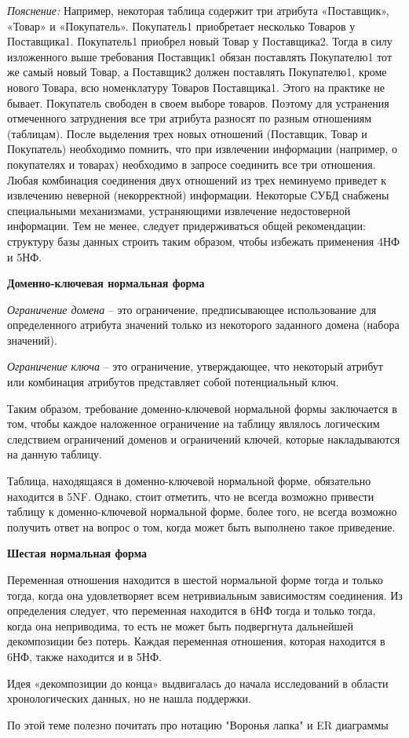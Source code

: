 \textit{Пояснение:} Например, некоторая таблица содержит три атрибута «Поставщик», «Товар» и «Покупатель». Покупатель1 приобретает несколько Товаров у Поставщика1. Покупатель1 приобрел новый Товар у Поставщика2. Тогда в силу изложенного выше требования Поставщик1 обязан поставлять Покупателю1 тот же самый новый Товар, а Поставщик2 должен поставлять Покупателю1, кроме нового Товара, всю номенклатуру Товаров Поставщика1. Этого на практике не бывает. Покупатель свободен в своем выборе товаров. Поэтому для устранения отмеченного затруднения все три атрибута разносят по разным отношениям (таблицам). После выделения трех новых отношений (Поставщик, Товар и Покупатель) необходимо помнить, что при извлечении информации (например, о покупателях и товарах) необходимо в запросе соединить все три отношения. Любая комбинация соединения двух отношений из трех неминуемо приведет к извлечению неверной (некорректной) информации. Некоторые СУБД снабжены специальными механизмами, устраняющими извлечение недостоверной информации. Тем не менее, следует придерживаться общей рекомендации: структуру базы данных строить таким образом, чтобы избежать применения 4НФ и 5НФ.



\textbf{Доменно-ключевая нормальная форма}

\textit{Ограничение домена} – это ограничение, предписывающее использование для определенного атрибута значений только из некоторого заданного домена (набора значений).

\textit{Ограничение ключа} – это ограничение, утверждающее, что некоторый атрибут или комбинация атрибутов представляет собой потенциальный ключ.

Таким образом, требование доменно-ключевой нормальной формы заключается в том, чтобы каждое наложенное ограничение на таблицу являлось логическим следствием ограничений доменов и ограничений ключей, которые накладываются на данную таблицу.

Таблица, находящаяся в доменно-ключевой нормальной форме, обязательно находится в 5NF. Однако, стоит отметить, что не всегда возможно привести таблицу к доменно-ключевой нормальной форме, более того, не всегда возможно получить ответ на вопрос о том, когда может быть выполнено такое приведение.

\textbf{Шестая нормальная форма}

Переменная отношения находится в шестой нормальной форме тогда и только тогда, когда она удовлетворяет всем нетривиальным зависимостям соединения. Из определения следует, что переменная находится в 6НФ тогда и только тогда, когда она неприводима, то есть не может быть подвергнута дальнейшей декомпозиции без потерь. Каждая переменная отношения, которая находится в 6НФ, также находится и в 5НФ.

Идея «декомпозиции до конца» выдвигалась до начала исследований в области хронологических данных, но не нашла поддержки.

По этой теме полезно почитать про нотацию "Воронья лапка" и ER диаграммы
